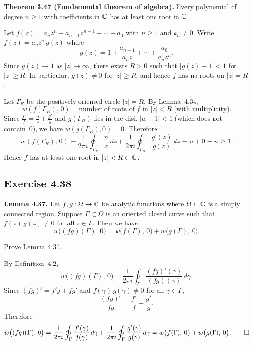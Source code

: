 \documentclass{article}
\begin{document}
\begin{solution}
  \textbf{Theorem 3.47 (Fundamental theorem of algebra).}
  Every polynomial of degree $n \ge 1$ with coefficients in $\mathbb{C}$
  has at least one root in $\mathbb{C}$.

  \medskip

  Let $f(z) = a_n z^n + a_{n-1}z^{n-1} + \cdots + a_0$
  with $n \ge 1$ and $a_n \ne 0$.
  Write $f(z) = a_n z^n\,g(z)$ where
  \[
    g(z) = 1 + \frac{a_{n-1}}{a_n z} + \cdots + \frac{a_0}{a_n z^n}.
  \]
  Since $g(z) \to 1$ as $|z| \to \infty$, there exists $R > 0$
  such that $|g(z) - 1| < 1$ for $|z| \ge R$.
  In particular, $g(z) \ne 0$ for $|z| \ge R$, and hence $f$
  has no roots on $|z| = R$.

  Let $\Gamma_R$ be the positively oriented circle $|z| = R$.
  By Lemma~4.34,
  \[
    w(f(\Gamma_R),\, 0)
    = \text{number of roots of } f \text{ in } |z| < R
      \text{ (with multiplicity)}.
  \]
  Since $\frac{f'}{f} = \frac{n}{z} + \frac{g'}{g}$ and
  $g(\Gamma_R)$ lies in the disk $|w - 1| < 1$ (which does not
  contain~$0$), we have $w(g(\Gamma_R), 0) = 0$.
  Therefore
  \[
    w(f(\Gamma_R),\, 0)
    = \frac{1}{2\pi i}\oint_{\Gamma_R}\!\frac{n}{z}\,dz
    + \frac{1}{2\pi i}\oint_{\Gamma_R}\!\frac{g'(z)}{g(z)}\,dz
    = n + 0 = n \ge 1.
  \]
  Hence $f$ has at least one root in $|z| < R \subset \mathbb{C}$.\qedhere
\end{solution}

\subsection{Exercise 4.38}

\textbf{Lemma 4.37.}
Let $f, g : \Omega \to \mathbb{C}$ be analytic functions where
$\Omega \subset \mathbb{C}$ is a simply connected region.  Suppose
$\Gamma \subset \Omega$ is an oriented closed curve such that
$f(z)\,g(z) \ne 0$ for all $z \in \Gamma$.  Then we have
\[
  w\bigl((fg)(\Gamma),\, 0\bigr)
  = w\bigl(f(\Gamma),\, 0\bigr)
  + w\bigl(g(\Gamma),\, 0\bigr).
\]

Prove Lemma 4.37.

\begin{solution}
  By Definition~4.2,
  \[
    w\bigl((fg)(\Gamma),\, 0\bigr)
    = \frac{1}{2\pi i}\oint_\Gamma
      \frac{(fg)'(\gamma)}{(fg)(\gamma)}\,d\gamma.
  \]
  Since $(fg)' = f'g + fg'$ and
  $f(\gamma)\,g(\gamma) \ne 0$ for all $\gamma \in \Gamma$,
  \[
    \frac{(fg)'}{fg} = \frac{f'}{f} + \frac{g'}{g}.
  \]
  Therefore
  \[
    w\bigl((fg)(\Gamma),\, 0\bigr)
    = \frac{1}{2\pi i}\oint_\Gamma \frac{f'(\gamma)}{f(\gamma)}\,d\gamma
    + \frac{1}{2\pi i}\oint_\Gamma \frac{g'(\gamma)}{g(\gamma)}\,d\gamma
    = w\bigl(f(\Gamma),\, 0\bigr) + w\bigl(g(\Gamma),\, 0\bigr).\qedhere
  \]
\end{solution}
\end{document}
